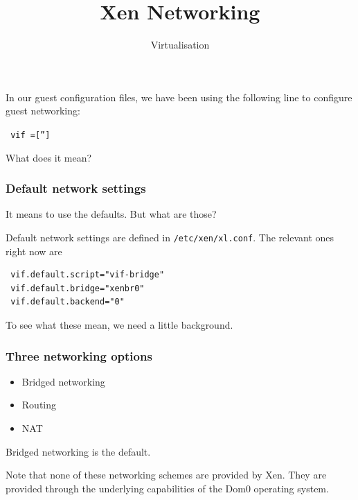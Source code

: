 \documentclass[10pt]{beamer}
\title{Xen Networking}
\author[I720]{Virtualisation}
\institute[Otago Polytechnic]{
  Otago Polytechnic \\
  Dunedin, New Zealand \\
}
\date{}
\begin{document}
\begin{frame}[plain]
  \titlepage
\end{frame}


\begin{frame}
  
  In our guest configuration files, we have been using the following line to configure guest networking:
  
  \vspace{5mm}
  
  \texttt{ vif =['']}
  
  \vspace{5mm}
  What does it mean?
  
  \end{frame}
  

\begin{frame}[fragile]
  \frametitle{Default network settings}
  
   It means to use the defaults. But what are those?
   
  \vspace{5mm}
  Default network settings are defined in \texttt{/etc/xen/xl.conf}. The relevant ones right now are
  
  \vspace{5mm}
  

\begin{verbatim}
 vif.default.script="vif-bridge"
 vif.default.bridge="xenbr0"
 vif.default.backend="0"
\end{verbatim}

\vspace{5mm}
To see what these mean, we need a little background.
\end{frame}

\begin{frame}
  \frametitle{Three networking options}
  
  \begin{itemize}
    \item Bridged networking
    \item Routing
    \item NAT
  \end{itemize}
  
  Bridged networking is the default.
  
  \vspace{5mm}
  Note that none of these networking schemes are provided by Xen. They are provided through
  the underlying capabilities of the Dom0 operating system.
  
  \end{frame}
\end{document}
